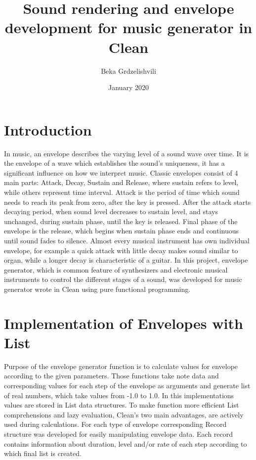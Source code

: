 \documentclass[12pt, a4paper]{article}
\title{Sound rendering and envelope development for music generator in Clean}
\author{Beka Grdzelishvili}
\date{January 2020}
\begin{document}
\maketitle

\section{Introduction}
In music, an envelope describes the varying level of a sound wave over time. It is the envelope of a wave which establishes the sound’s uniqueness, it has a significant influence on how we interpret music. Classic envelopes consist of 4 main parts: Attack, Decay, Sustain and Release, where sustain refers to level, while others represent time interval. Attack is the period of time which sound needs to reach its peak from zero, after the key is pressed. After the attack starts decaying period, when sound level decreases to sustain level, and stays unchanged, during sustain phase, until the key is released. Final phase of the envelope is the release, which begins when sustain phase ends and continuous until sound fades to silence. Almost every musical instrument has own individual envelope, for example a quick attack with little decay makes sound similar to organ, while a longer decay is characteristic of a guitar. In this project, envelope generator, which is common feature of synthesizers and electronic musical instruments to control the different stages of a sound, was developed for music generator wrote in Clean using pure functional programming.

\section{Implementation of Envelopes with List}

Purpose of the envelope generator function is to calculate values for envelope according to the given parameters. Those functions take note data and corresponding values for each step of the envelope as arguments and generate list of real numbers, which take values from -1.0 to 1.0. In this implementations values are stored in List data structures. To make function more efficient List comprehensions and lazy evaluation, Clean’s two main advantages, are actively used during calculations. For each type of envelope corresponding Record structure was developed for easily manipulating envelope data. Each record contains information about duration, level and/or rate of each step according to which final list is created. 
\end{document}
